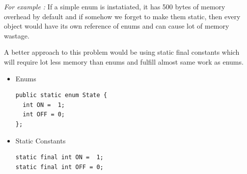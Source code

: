 \documentclass[journal]{IEEEtran}
\begin{document}
\emph{For example :} If a simple enum is instatiated, it has 500 bytes of memory overhead by default and if somehow we forget to make them static, then every object would have its own reference of enums and can cause lot of memory wastage.

A better approach to this problem would be using static final constants which will require lot less memory than enums and fulfill almost same work as enums.

\begin{itemize}
	\item Enums
\begin{verbatim}
public static enum State {
  int ON =  1;
  int OFF = 0;
};
\end{verbatim}
	\item Static Constants
\begin{verbatim}
static final int ON =  1;
static final int OFF = 0;
\end{verbatim}
\end{itemize}

\newpage
\end{document}
